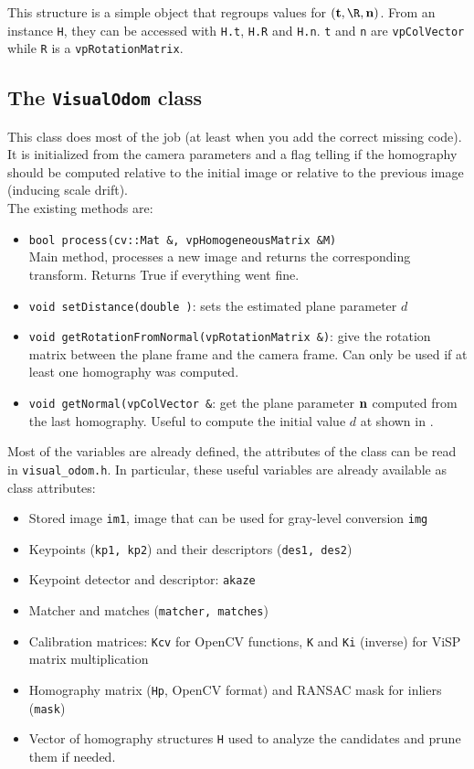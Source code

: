 \documentclass{ecnreport}
\begin{document}
This structure is a simple object that regroups values for $(\t,\R,\n)$. From an instance \texttt{H}, they can be accessed with \texttt{H.t}, 
\texttt{H.R} and \texttt{H.n}. \texttt{t} and \texttt{n} are \texttt{vpColVector} while \texttt{R} is a \texttt{vpRotationMatrix}.

\subsection{The \texttt{VisualOdom} class}

This class does most of the job (at least when you add the correct missing code). It is initialized from the camera parameters and a flag telling if the homography
should be computed relative to the initial image or relative to the previous image (inducing scale drift).\\
The existing methods are:
\begin{itemize}
 \item \texttt{bool process(cv::Mat \&, vpHomogeneousMatrix \&M)} \\ 
 Main method, processes a new image and returns the corresponding transform. Returns True if everything went fine. 
 \item \texttt{void setDistance(double )}: sets the estimated plane parameter $d$
 \item \texttt{void getRotationFromNormal(vpRotationMatrix \&)}: give the rotation matrix between the plane frame and the camera frame. Can only be used
 if at least one homography was computed.
  \item \texttt{void getNormal(vpColVector \&}: get the plane parameter $\mathbf{n}$ computed from the last homography. Useful to compute the initial value $d$ at shown in .
\end{itemize}

Most of the variables are already defined, the attributes of the class can be read in \texttt{visual\_odom.h}. In particular, 
these useful variables are already available as class attributes:
\begin{itemize}
\item Stored image \texttt{im1}, image that can be used for gray-level conversion \texttt{img}
 \item Keypoints (\texttt{kp1, kp2}) and their descriptors (\texttt{des1, des2})
 \item Keypoint detector and descriptor: \texttt{akaze}
 \item Matcher and matches (\texttt{matcher, matches})
 \item Calibration matrices: \texttt{Kcv} for OpenCV functions, \texttt{K} and \texttt{Ki} (inverse) for ViSP matrix multiplication
 \item Homography matrix (\texttt{Hp}, OpenCV format) and RANSAC mask for inliers (\texttt{mask})
 \item Vector of homography structures \texttt{H} used to analyze the candidates and prune them if needed.
\end{itemize}
\end{document}
